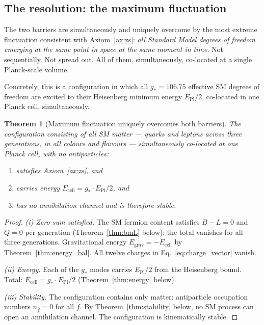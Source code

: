 \documentclass[12pt,a4paper]{article}
\newtheorem{theorem}{Theorem}[section]
\theoremstyle{definition}
\theoremstyle{remark}
\newcommand{\EPl}{E_{\mathrm{Pl}}}
\newcommand{\gstar}{g_{*}}
\begin{document}
\subsection{The resolution: the maximum fluctuation}

The two barriers are simultaneously and uniquely overcome by the most extreme
fluctuation consistent with Axiom~\ref{ax:zs}: \emph{all Standard Model
degrees of freedom emerging at the same point in space at the same moment
in time}. Not sequentially. Not spread out. All of them, simultaneously,
co-located at a single Planck-scale volume.

Concretely, this is a configuration in which all $\gstar = 106.75$
effective SM degrees of freedom are excited to their Heisenberg minimum
energy $\EPl/2$, co-located in one Planck cell, simultaneously.

\begin{theorem}[Maximum fluctuation uniquely overcomes both barriers]
\label{thm:maxfluc}
The configuration consisting of all SM matter --- quarks and leptons across
three generations, in all colours and flavours --- simultaneously co-located
at one Planck cell, with no antiparticles:
\begin{enumerate}[label=(\roman*)]
  \item satisfies Axiom~\ref{ax:zs}, and
  \item carries energy $E_{\mathrm{cell}} = \gstar \cdot \EPl/2$, and
  \item has no annihilation channel and is therefore stable.
\end{enumerate}
\end{theorem}
\begin{proof}
\textit{(i) Zero-sum satisfied.}
The SM fermion content satisfies $B - L = 0$ and $Q = 0$ per generation
(Theorem~\ref{thm:bmL} below); the total vanishes for all three generations.
Gravitational energy $E_\mathrm{grav} = -E_\mathrm{cell}$ by
Theorem~\ref{thm:energy_bal}. All twelve charges in
Eq.~\eqref{eq:charge_vector} vanish.

\textit{(ii) Energy.}
Each of the $\gstar$ modes carries $\EPl/2$ from the Heisenberg bound.
Total: $E_{\mathrm{cell}} = \gstar \cdot \EPl/2$ (Theorem~\ref{thm:energy}
below).

\textit{(iii) Stability.}
The configuration contains only matter: antiparticle occupation numbers
$n_{\bar{f}} = 0$ for all $\bar{f}$.
By Theorem~\ref{thm:stability} below, no SM process can open an annihilation
channel. The configuration is kinematically stable.
\end{proof}
\end{document}
